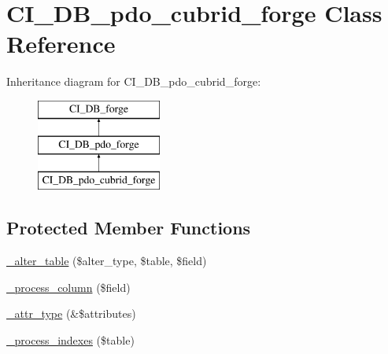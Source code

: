 \hypertarget{class_c_i___d_b__pdo__cubrid__forge}{}\section{C\+I\+\_\+\+D\+B\+\_\+pdo\+\_\+cubrid\+\_\+forge Class Reference}
\label{class_c_i___d_b__pdo__cubrid__forge}
Inheritance diagram for C\+I\+\_\+\+D\+B\+\_\+pdo\+\_\+cubrid\+\_\+forge\+:\begin{figure}[H]
\begin{center}
\leavevmode
\includegraphics[height=3.000000cm]{class_c_i___d_b__pdo__cubrid__forge}
\end{center}
\end{figure}
\subsection*{Protected Member Functions}
\begin{DoxyCompactItemize}
\item 
\mbox{\hyperlink{class_c_i___d_b__pdo__cubrid__forge_ae91bfc16e4acc53e5b7c1ecc43d92222}{\+\_\+alter\+\_\+table}} (\$alter\+\_\+type, \$table, \$field)
\item 
\mbox{\hyperlink{class_c_i___d_b__pdo__cubrid__forge_aa51310e89a85716287fabd6b58a85550}{\+\_\+process\+\_\+column}} (\$field)
\item 
\mbox{\hyperlink{class_c_i___d_b__pdo__cubrid__forge_a1284f881bce9fdfe272877b1edd31bd7}{\+\_\+attr\+\_\+type}} (\&\$attributes)
\item 
\mbox{\hyperlink{class_c_i___d_b__pdo__cubrid__forge_a8289f3cda7509eff9e7d228ab57506d8}{\+\_\+process\+\_\+indexes}} (\$table)
\end{DoxyCompactItemize}
